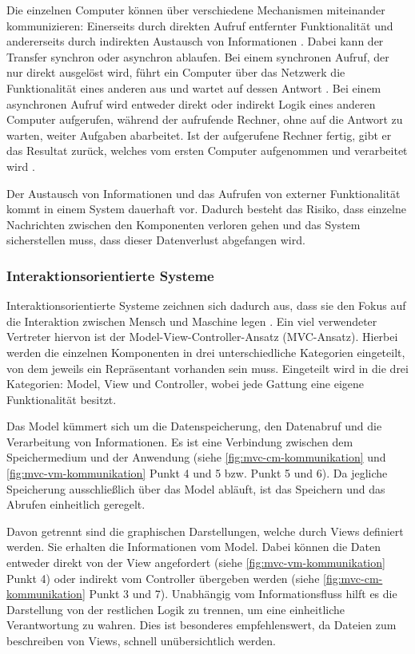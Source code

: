 Die einzelnen Computer können über verschiedene Mechanismen miteinander kommunizieren: Einerseits durch direkten Aufruf entfernter Funktionalität und andererseits durch indirekten Austausch von Informationen \parencite[vgl.][S. 116]{starke_effektive_2015}. Dabei kann der Transfer synchron oder asynchron ablaufen. Bei einem synchronen Aufruf, der nur direkt ausgelöst wird, führt ein Computer über das Netzwerk die Funktionalität eines anderen aus und wartet auf dessen Antwort \parencite{synchrone_2018}.
Bei einem asynchronen Aufruf wird entweder direkt oder indirekt Logik eines anderen Computer aufgerufen, während der aufrufende Rechner, ohne auf die Antwort zu warten, weiter Aufgaben abarbeitet. Ist der aufgerufene Rechner fertig, gibt er das Resultat zurück, welches vom ersten Computer aufgenommen und verarbeitet wird \parencite{wiki_asynchrone_2019}.

Der Austausch von Informationen und das Aufrufen von externer Funktionalität kommt in einem System dauerhaft vor. Dadurch besteht das Risiko, dass einzelne Nachrichten zwischen den Komponenten verloren gehen und das System sicherstellen muss, dass dieser Datenverlust abgefangen wird.

\subsubsection{Interaktionsorientierte Systeme}
\label{sec:mvc}

Interaktionsorientierte Systeme zeichnen sich dadurch aus, dass sie den Fokus auf die Interaktion zwischen Mensch und Maschine legen \parencite[vgl.][S. 124]{starke_effektive_2015}.
Ein viel verwendeter Vertreter hiervon ist der Model-View-Controller-Ansatz (MVC-Ansatz). Hierbei werden die einzelnen Komponenten in drei unterschiedliche Kategorien eingeteilt, von dem jeweils ein Repräsentant vorhanden sein muss. Eingeteilt wird in die drei Kategorien: Model, View und Controller, wobei jede Gattung eine eigene Funktionalität besitzt.

Das Model kümmert sich um die Datenspeicherung, den Datenabruf und die Verarbeitung von Informationen. Es ist eine Verbindung zwischen dem Speichermedium und der Anwendung (siehe \cref{fig:mvc-cm-kommunikation} und \cref{fig:mvc-vm-kommunikation} Punkt 4 und 5 bzw. Punkt 5 und 6). Da jegliche Speicherung ausschließlich über das Model abläuft, ist das Speichern und das Abrufen einheitlich geregelt.

Davon getrennt sind die graphischen Darstellungen, welche durch Views definiert werden. Sie erhalten die Informationen vom Model. Dabei können die Daten entweder direkt von der View angefordert (siehe \cref{fig:mvc-vm-kommunikation} Punkt 4) oder indirekt vom Controller übergeben werden (siehe \cref{fig:mvc-cm-kommunikation} Punkt 3 und 7). Unabhängig vom Informationsfluss hilft es die Darstellung von der restlichen Logik zu trennen, um eine einheitliche Verantwortung zu wahren. Dies ist besonderes empfehlenswert, da Dateien zum beschreiben von Views, schnell unübersichtlich werden.

